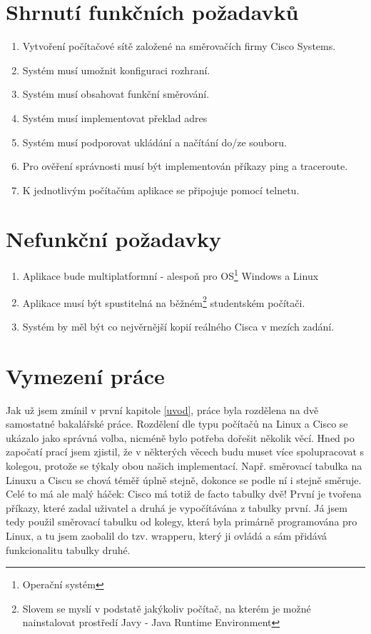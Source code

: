 \section{Shrnutí funkčních požadavků}
\begin{enumerate}
 \item Vytvoření počítačové sítě založené na směrovačích firmy Cisco Systems.
 \item Systém musí umožnit konfiguraci rozhraní.
 \item Systém musí obsahovat funkční směrování.
 \item Systém musí implementovat překlad adres
 \item Systém musí podporovat ukládání a načítání do/ze souboru.
 \item Pro ověření správnosti musí být implementován příkazy ping a traceroute.
 \item K jednotlivým počítačům aplikace se připojuje pomocí telnetu.
\end{enumerate}

\section{Nefunkční požadavky}
\begin{enumerate}
 \item Aplikace bude multiplatformní - alespoň pro OS\footnote{Operační systém} Windows a Linux
 \item Aplikace musí být spustitelná na běžném\footnote{Slovem  se myslí v podstatě jakýkoliv počítač, na kterém je možné nainstalovat prostředí Javy - Java Runtime Environment} studentském počítači.
 \item Systém by měl být co nejvěrnější kopií reálného Cisca v mezích zadání.
\end{enumerate}


\section{Vymezení práce} \label{vymezeni}
Jak už jsem zmínil v první kapitole \ref{uvod}, práce byla rozdělena na dvě samostatné bakalářské práce. Rozdělení dle typu počítačů na Linux a Cisco se ukázalo jako správná volba, nicméně bylo potřeba dořešit několik věcí. Hned po započatí prací jsem zjistil, že v některých věcech budu muset více spolupracovat s kolegou, protože se týkaly obou našich implementací. Např. směrovací tabulka na Linuxu a Ciscu se chová téměř úplně stejně, dokonce se podle ní i stejně směruje. Celé to má ale malý háček: Cisco má totiž de facto tabulky dvě! První je tvořena příkazy, které zadal uživatel a druhá je vypočítávána z tabulky první. Já jsem tedy použil směrovací tabulku od kolegy, která byla primárně programována pro Linux, a tu jsem zaobalil do tzv. wrapperu, který ji ovládá a sám přidává funkcionalitu tabulky druhé. 

